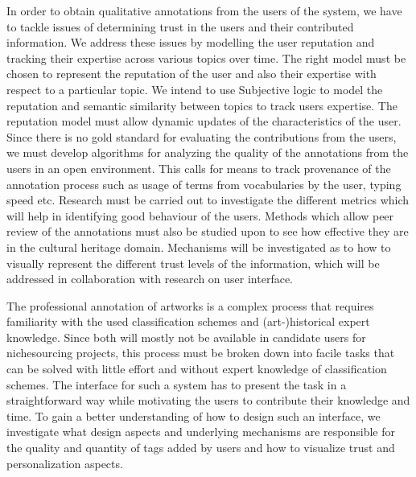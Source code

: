 In order to obtain qualitative annotations from the users of the system, we have to tackle issues of determining trust in the users and their contributed information. We address these issues by modelling the user reputation and tracking their expertise across various topics over time. The right model must be chosen to represent the reputation of the user and also their expertise with respect to a particular topic. We intend to use Subjective logic to model the reputation and semantic similarity between topics to track users expertise. The reputation model must allow dynamic updates of the characteristics of the user. Since there is no gold standard for evaluating the contributions from the users, we must develop algorithms for analyzing the quality of the annotations from the users in an open environment. This calls for means to track provenance of the annotation process such as usage of terms from vocabularies by the user, typing speed etc. Research must be carried out to investigate the different metrics which will help in identifying good behaviour of the users. Methods which allow peer review of the annotations must also be studied upon to see how effective they are in the cultural heritage domain. Mechanisms will be investigated as to how to visually represent the different trust levels of the information, which will be addressed in collaboration with research on user interface.




The professional annotation of artworks is a complex process that requires familiarity with the used classification schemes and (art-)historical expert knowledge. 
Since both will mostly not be available in candidate users for nichesourcing projects, this process must be broken down into facile tasks that can be solved with little effort and without expert knowledge of classification schemes.
The interface for such a system has to present the task in a straightforward way while motivating the users to contribute their knowledge and time.
To gain a better understanding of how to design such an interface, we investigate what design aspects and underlying mechanisms are responsible for the quality and quantity of tags added by users and how to visualize trust and personalization aspects.

